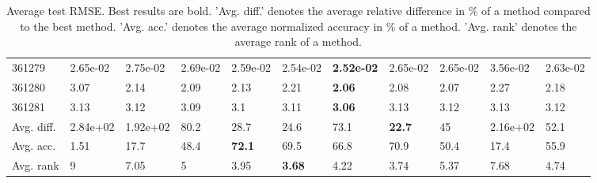 \begin{table}[ht!]
\begin{tabular}{lllllllllll}
  361279 & 2.65e-02 & 2.75e-02 & 2.69e-02 & 2.59e-02 & 2.54e-02 & \textbf{2.52e-02} & 2.65e-02 & 2.65e-02 & 3.56e-02 & 2.63e-02 \\ 
  361280 & 3.07 & 2.14 & 2.09 & 2.13 & 2.21 & \textbf{2.06} & 2.08 & 2.07 & 2.27 & 2.18 \\ 
  361281 & 3.13 & 3.12 & 3.09 & 3.1 & 3.11 & \textbf{3.06} & 3.13 & 3.12 & 3.13 & 3.12 \\ 
   \hline
Avg. diff. & 2.84e+02 & 1.92e+02 & 80.2 & 28.7 & 24.6 & 73.1 & \textbf{22.7} & 45 & 2.16e+02 & 52.1 \\ 
  Avg. acc. & 1.51 & 17.7 & 48.4 & \textbf{72.1} & 69.5 & 66.8 & 70.9 & 50.4 & 17.4 & 55.9 \\ 
  Avg. rank & 9 & 7.05 & 5 & 3.95 & \textbf{3.68} & 4.22 & 3.74 & 5.37 & 7.68 & 4.74 \\ 
   \hline
\hline
\end{tabular}
\endgroup
\caption{Average test RMSE. 
                  Best results are bold. 
                  'Avg. diff.' denotes the average relative difference in \% of a method compared to the best method.
                  'Avg. acc.' denotes the average normalized accuracy in \% of a method.
                  'Avg. rank' denotes the average rank of a method.} 
\label{TABLES/table_results_RMSE_umap}
\end{table}
